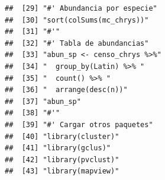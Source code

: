\documentclass[11pt,]{article}
\begin{document}
\begin{verbatim}
##  [29] "#' Abundancia por especie"                                                                                                                                             
##  [30] "sort(colSums(mc_chrys))"                                                                                                                                               
##  [31] "#'"                                                                                                                                                                    
##  [32] "#' Tabla de abundancias"                                                                                                                                               
##  [33] "abun_sp <- censo_chrys %>%"                                                                                                                                            
##  [34] "  group_by(Latin) %>% "                                                                                                                                                
##  [35] "  count() %>% "                                                                                                                                                        
##  [36] "  arrange(desc(n))"                                                                                                                                                    
##  [37] "abun_sp"                                                                                                                                                               
##  [38] "#'"                                                                                                                                                                    
##  [39] "#' Cargar otros paquetes"                                                                                                                                              
##  [40] "library(cluster)"                                                                                                                                                      
##  [41] "library(gclus)"                                                                                                                                                        
##  [42] "library(pvclust)"                                                                                                                                                      
##  [43] "library(mapview)"                                                                                                                                                      

\end{verbatim}
\end{document}
